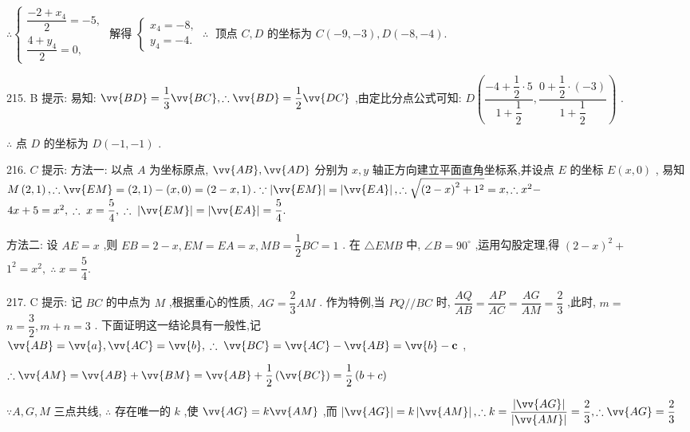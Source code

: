 $\therefore \left\{  {\begin{array}{l} \dfrac{-2 + {x}_{4}}{2} =  - 5, \\  \dfrac{4 + {y}_{4}}{2} = 0, \end{array}\text{ 解得 }\left\{  {\begin{array}{l} {x}_{4} =  - 8, \\  {y}_{4} =  - 4. \end{array}\;\therefore \;\text{ 顶点 }C,D\text{ 的坐标为 }C\left( {-9, - 3}\right) ,D\left( {-8, - 4}\right) .}\right. }\right.$

215. B 提示: 易知: $\vv{BD} = \dfrac{1}{3}\vv{BC},\therefore \vv{BD} = \dfrac{1}{2}\vv{DC}$ ,由定比分点公式可知: $D\left( {\dfrac{-4 + \dfrac{1}{2} \cdot  5}{1 + \dfrac{1}{2}},\dfrac{0 + \dfrac{1}{2} \cdot  \left( {-3}\right) }{1 + \dfrac{1}{2}}}\right)$ .

$\therefore$ 点 $D$ 的坐标为 $D\left( {-1, - 1}\right)$ .

216. $C$ 提示: 方法一: 以点 $A$ 为坐标原点, $\vv{AB},\vv{AD}$ 分别为 $x,y$ 轴正方向建立平面直角坐标系,并设点 $E$ 的坐标 $E\left( {x,0}\right)$ , 易知 $M\left( {2,1}\right) ,\therefore \vv{EM} = \left( {2,1}\right)  - \left( {x,0}\right)  = \left( {2 - x,1}\right) .\because \left| \vv{EM}\right|  = \left| \vv{EA}\right| ,\therefore \sqrt{{\left( 2 - x\right) }^{2} + {1}^{2}} = x,\therefore {x}^{2} -$  ${4x} + 5 = {x}^{2},\;\therefore \;x = \dfrac{5}{4},\;\therefore \;\left| \vv{EM}\right|  = \left| \vv{EA}\right|  = \dfrac{5}{4}.$

方法二: 设 ${AE} = x$ ,则 ${EB} = 2 - x,{EM} = {EA} = x,{MB} = \dfrac{1}{2}{BC} = 1$ . 在 $\bigtriangleup {EMB}$ 中, $\angle B = {90}^{ \circ  }$ ,运用勾股定理,得 ${\left( 2 - x\right) }^{2} +$  ${1}^{2} = {x}^{2},\;\therefore \;x = \dfrac{5}{4}.$

217. C 提示: 记 ${BC}$ 的中点为 $M$ ,根据重心的性质, ${AG} = \dfrac{2}{3}{AM}$ . 作为特例,当 ${PQ}//{BC}$ 时, $\dfrac{AQ}{AB} = \dfrac{AP}{AC} = \dfrac{AG}{AM} = \dfrac{2}{3}$ ,此时, $m =$  $n = \dfrac{3}{2},m + n = 3$ . 下面证明这一结论具有一般性,记 $\vv{AB} = \vv{a},\vv{AC} = \vv{b},\;\therefore \;\vv{BC} = \vv{AC} - \vv{AB} = \vv{b} - \mathbf{c}$ ,

$\therefore \vv{AM} = \vv{AB} + \vv{BM} = \vv{AB} + \dfrac{1}{2}\left( \vv{BC}\right)  = \dfrac{1}{2}\left( {b + c}\right)$

$\because A,G,M$ 三点共线, $\therefore$ 存在唯一的 $k$ ,使 $\vv{AG} = k\vv{AM}$ ,而 $\left| \vv{AG}\right|  = k\left| \vv{AM}\right| ,\therefore k = \dfrac{\left| \vv{AG}\right| }{\left| \vv{AM}\right| } = \dfrac{2}{3},\therefore \vv{AG} = \dfrac{2}{3}$

